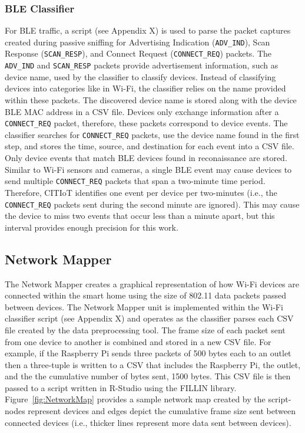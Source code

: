 \documentclass[12pt,letterpaper,oneside]{book}
\begin{document}
			\subsubsection{\ac{BLE} Classifier}
			For \ac{BLE} traffic, a script (see Appendix X) is used to parse the packet captures created during passive sniffing for Advertising Indication (\texttt{ADV\_IND}), Scan Response (\texttt{SCAN\_RESP}), and Connect Request (\texttt{CONNECT\_REQ}) packets. The  \texttt{ADV\_IND} and \texttt{SCAN\_RESP} packets provide advertisement information, such as device name, used by the classifier to classify devices. Instead of classifying devices into categories like in Wi-Fi, the classifier relies on the name provided within these packets. The discovered device name is stored along with the device \ac{BLE} \ac{MAC} address in a \ac{CSV} file. Devices only exchange information after a \texttt{CONNECT\_REQ} packet, therefore, these packets correspond to device events. The classifier searches for \texttt{CONNECT\_REQ} packets, use the device name found in the first step, and stores the time, source, and destination for each event into a \ac{CSV} file. Only device events that match \ac{BLE} devices found in reconaissance are stored. Similar to Wi-Fi sensors and cameras, a single \ac{BLE} event may cause devices to send multiple \texttt{CONNECT\_REQ} packets that span a two-minute time period. Therefore, \ac{CITIoT} identifies one event per device per two-minutes (i.e., the \texttt{CONNECT\_REQ} packets sent during the second minute are ignored). This may cause the device to miss two events that occur less than a minute apart, but this interval provides enough precision for this work.
			
			\done{}
			\done{}
			\done{}
		
			\subsection{Network Mapper}
			The Network Mapper creates a graphical representation of how Wi-Fi devices are connected within the smart home using the size of 802.11 data packets passed between devices. The Network Mapper unit is implemented within the Wi-Fi classifier script (see Appendix X) and operates as the classifier parses each \ac{CSV} file created by the data preprocessing tool. The frame size of each packet sent from one device to another is combined and stored in a new \ac{CSV} file. For example, if the Raspberry Pi sends three packets of 500 bytes each to an outlet then a three-tuple is written to a \ac{CSV} that includes the Raspberry Pi, the outlet, and the the cumulative number of bytes sent, 1500 bytes. This \ac{CSV} file is then passed to a script written in R-Studio using the FILLIN library. Figure~\ref{fig:NetworkMap} provides a sample network map created by the script- nodes represent devices and edges depict the cumulative frame size sent between connected devices (i.e., thicker lines represent more data sent between devices).
			
\end{document}
